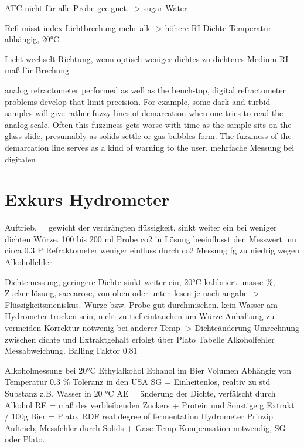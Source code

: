 \documentclass[a4paper,parskip=half]{scrartcl}
\begin{document}
ATC nicht
für alle Probe geeignet. -> sugar Water
\autocite{Depalma2017}

Refi misst index Lichtbrechung
mehr alk -> höhere RI
Dichte Temperatur abhängig, 20°C
\autocite{Gossett2012}

Licht wechselt Richtung, wenn optisch weniger dichtes zu dichteres Medium
RI maß für Brechung

\autocite{Spedding2016}

analog refractometer performed as well as the bench-top, digital refractometer
problems develop that limit precision.  For example, some dark and turbid samples will give rather fuzzy lines of demarcation when one tries to read the analog scale.  Often this fuzziness gets worse with time as the sample sits on the glass slide, presumably as solids settle or gas bubbles form.  The fuzziness of the demarcation line serves as a kind of warning to the user. 
mehrfache Messung bei digitalen
\autocite{Gossett2012a}

\section*{Exkurs Hydrometer}

Auftrieb, = gewicht der verdrängten flüssigkeit, sinkt weiter
ein bei weniger dichten Würze.
100 bis 200 ml Probe
co2 in Lösung beeinflusst den Messwert um circa 0.3 P
Refraktometer weniger einfluss durch co2
Messung fg zu niedrig wegen Alkoholfehler
\autocite{Novotny2017}

Dichtemessung, geringere Dichte sinkt weiter ein, 20°C kalibriert.
masse \%, Zucker lösung, saccarose, von oben oder unten lesen je
nach angabe -> Flüssigkeitsmeniskus.
Würze bzw. Probe gut durchmischen. kein Wasser am Hydrometer trocken
sein, nicht zu tief eintauchen um Würze Anhaftung zu vermeiden
Korrektur notwenig bei anderer Temp -> Dichteänderung
Umrechnung zwischen dichte und Extraktgehalt erfolgt über Plato Tabelle
Alkoholfehler Messabweichung.
Balling Faktor 0.81
\autocite{Kunze2004}

Alkoholmessung bei 20°C Ethylalkohol Ethanol im Bier
Volumen Abhängig von Temperatur
0.3 \% Toleranz in den USA
SG = Einheitenlos, realtiv zu std Substanz z.B. Wasser in 20 °C
AE = änderung der Dichte, verfälscht durch Alkohol
RE = maß des verbleibenden Zuckers + Protein und Sonstige
g Extrakt / 100g Bier = Plato.
RDF real degree of fermentation
Hydrometer Prinzip Auftrieb, Messfehler durch Solids + Gase
Temp Kompensation notwendig,
SG oder Plato. 
\autocite{Spedding2016}
\end{document}
